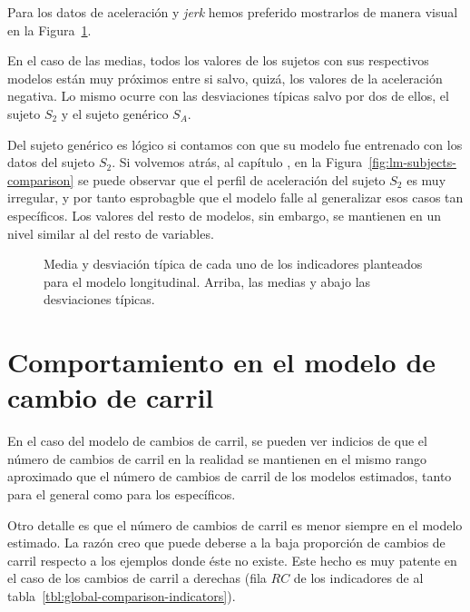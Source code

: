 Para los datos de aceleración y \textit{jerk} hemos preferido mostrarlos de manera visual en la Figura~\ref{fig:lc-global-comparison-indicators}.

En el caso de las medias, todos los valores de los sujetos con sus respectivos modelos están muy próximos entre si salvo, quizá, los valores de la aceleración negativa. Lo mismo ocurre con las desviaciones típicas salvo por dos de ellos, el sujeto $S_2$ y el sujeto genérico $S_A$.

Del sujeto genérico es lógico si contamos con que su modelo fue entrenado con los datos del sujeto $S_2$. Si volvemos atrás, al capítulo , en la Figura~\ref{fig:lm-subjects-comparison} se puede observar que el perfil de aceleración del sujeto $S_2$ es muy irregular, y por tanto esprobagble que el modelo falle al generalizar esos casos tan específicos. Los valores del resto de modelos, sin embargo, se mantienen en un nivel similar al del resto de variables.

\begin{figure}[!b]
	\centering
	\qquad
	\qquad
	\caption[Medias y desviaciones típicas de los indicadores del modelo longitudinal]{Media y desviación típica de cada uno de los indicadores planteados para el modelo longitudinal. Arriba, las medias y abajo las desviaciones típicas.}
	\label{fig:lc-global-comparison-indicators}
\end{figure}

\section{Comportamiento en el modelo de cambio de carril}

En el caso del modelo de cambios de carril, se pueden ver indicios de que el número de cambios de carril en la realidad se mantienen en el mismo rango aproximado que el número de cambios de carril de los modelos estimados, tanto para el general como para los específicos.

Otro detalle es que el número de cambios de carril es menor siempre en el modelo estimado. La razón creo que puede deberse a la baja proporción de cambios de carril respecto a los ejemplos donde éste no existe. Este hecho es muy patente en el caso de los cambios de carril a derechas (fila $RC$ de los indicadores de al tabla~\ref{tbl:global-comparison-indicators}).